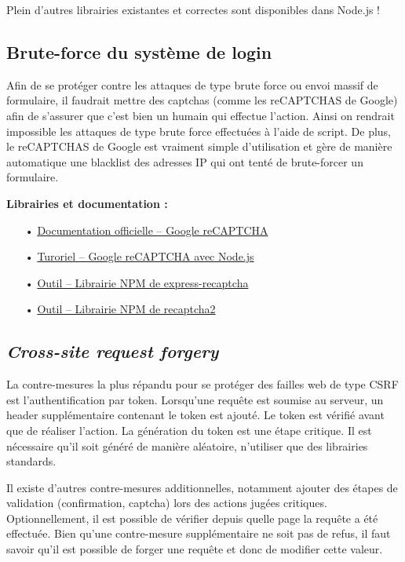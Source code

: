 \documentclass[12pt]{article}
\begin{document}
Plein d'autres librairies existantes et correctes sont disponibles dans Node.js !
\clearpage

\subsection{Brute-force du système de login}
\label{ssec:cm-bruteforce}

Afin de se protéger contre les attaques de type brute force ou envoi massif de formulaire, il faudrait mettre des captchas (comme les reCAPTCHAS de Google) afin de s'assurer que c'est bien un humain qui effectue l'action. Ainsi on rendrait impossible les attaques de type brute force effectuées à l'aide de script. De plus, le reCAPTCHAS de Google est vraiment simple d'utilisation et gère de manière automatique une blacklist des adresses IP qui ont tenté de brute-forcer un formulaire. 

\medskip
\textbf{Librairies et documentation :}

\begin{itemize}
\item[•] \href{https://www.google.com/recaptcha/intro/v3beta.html}{Documentation officielle -- Google reCAPTCHA}
\item[•] \href{https://codeforgeek.com/2016/03/google-recaptcha-node-js-tutorial/}{Turoriel -- Google reCAPTCHA avec Node.js}
\item[•] \href{https://www.npmjs.com/package/express-recaptcha}{Outil -- Librairie NPM de express-recaptcha}
\item[•] \href{https://www.npmjs.com/package/recaptcha2}{Outil -- Librairie NPM de recaptcha2}
\end{itemize}

\subsection{\emph{Cross-site request forgery}}
\label{ssec:cm-csrf}

La contre-mesures la plus répandu pour se protéger des failles web de type CSRF est l'authentification par token. Lorsqu'une requête est soumise au serveur, un header supplémentaire contenant le token est ajouté. Le token est vérifié avant que de réaliser l'action. La génération du token est une étape critique. Il est nécessaire qu'il soit généré de manière aléatoire, n'utiliser que des librairies standards.

Il existe d'autres contre-mesures additionnelles, notamment ajouter des étapes de validation (confirmation, captcha) lors des actions jugées critiques. Optionnellement, il est possible de vérifier depuis quelle page la requête a été effectuée. Bien qu'une contre-mesure supplémentaire ne soit pas de refus, il faut savoir qu'il est possible de forger une requête et donc de modifier cette valeur.
\end{document}
